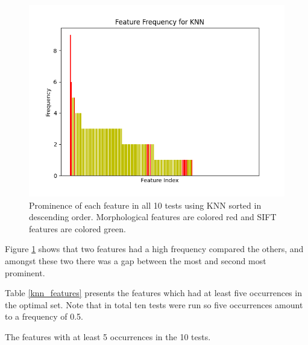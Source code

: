 \documentclass{kththesis}
\begin{document}
\begin{figure}[h!]
  \centering
  \includegraphics[scale=0.8]{figures/knn_all_freqs.png}
  \caption{Prominence of each feature in all 10 tests using KNN sorted in descending order. Morphological features are colored red and SIFT features are colored green.}
  \label{fig:freq_knn}
\end{figure}

\newpage

Figure \ref{fig:freq_knn} shows that two features had a high frequency compared the others, and amongst these two there was a gap between the most and second most prominent.

Table \ref{knn_features} presents the features which had at least five occurrences in the optimal set. Note that in total ten tests were run so five occurrences amount to a frequency of 0.5.

\begin{table}[h!]
  \caption{The features with at least 5 occurrences in the 10 tests.}
  \begin{center}
  \end{center}
  \label{knn_features}
\end{table}
\end{document}
